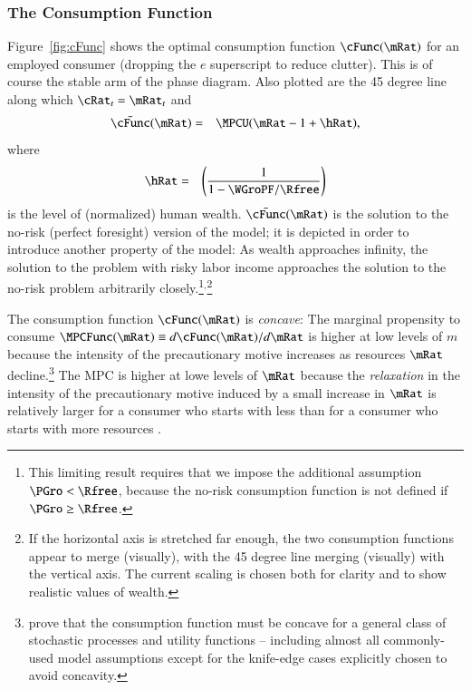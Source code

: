 \documentclass[titlepage,abstract]{\econtex}\newcommand{\texname}{ctDiscrete}
\begin{document}
\subsubsection{The Consumption Function \label{sec:consumptionfunction} }
Figure~\ref{fig:cFunc} shows the optimal consumption function $\cFunc(\mRat)$ for an employed consumer (dropping the $e$ superscript to reduce clutter). This is of course the stable arm of the phase diagram. Also plotted are the 45 degree line along which $\cRat_{t} = \mRat_{t}$ and 
\begin{eqnarray}
\label{eq:norisk-consumption}
  \bar{\cFunc}(\mRat) & = & \MPCU(\mRat-1+\hRat),
\end{eqnarray}
where
\begin{eqnarray*}
  \hRat & = & \left(\frac{1}{1-\WGroPF/\Rfree}\right)
\end{eqnarray*}
is the level of (normalized) human wealth.   $\bar{\cFunc}(\mRat)$ is the solution to the no-risk (perfect foresight) version of the model; it is depicted in order to introduce another property of the model: As wealth approaches infinity, the solution to the problem with risky labor income approaches the solution to the no-risk problem arbitrarily closely.\footnote{This limiting result requires that we impose the additional assumption $\PGro < \Rfree$, because the no-risk consumption function is not defined if $\PGro \geq \Rfree$.
}$^{,}$\footnote{If the horizontal axis is stretched far enough, 
  the two consumption functions appear to merge (visually), 
  with the 45 degree line merging (visually) with the vertical axis. 
  The current scaling is chosen both for clarity and 
  to show realistic values of wealth.}


The consumption function $\cFunc(\mRat)$ is \textit{concave}: The marginal
propensity to consume $\MPCFunc(\mRat) \equiv d \cFunc(\mRat)/d \mRat$
is higher at low levels of $m$ because the intensity of the
precautionary motive increases as resources $\mRat$
decline.\footnote{\cite{carroll&kimball:concavity} prove that the
  consumption function must be concave for a general class of
  stochastic processes and utility functions -- including almost all
  commonly-used model assumptions except for the knife-edge cases
  explicitly chosen to avoid concavity.}  The MPC is higher at lowe
levels of $\mRat$ because the \textit{relaxation} in the intensity of the
precautionary motive induced by a small increase in $\mRat$
\citep{kimball:smallandlarge} is relatively larger for a consumer who
starts with less than for a consumer who starts with more resources
\citep{carroll&kimball:concavity}. 
\end{document}
